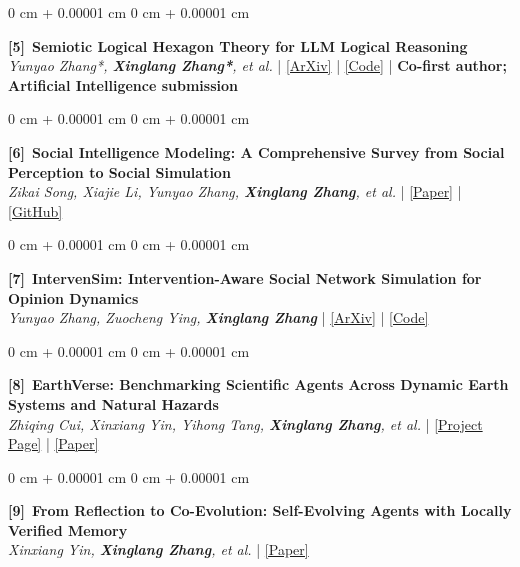 \documentclass[10pt, letterpaper]{article}
\newcommand{\pubnum}[1]{{\footnotesize\textbf{[#1]}}}
\newenvironment{onecolentry}{
    \begin{adjustwidth}{
        0 cm + 0.00001 cm
    }{
        0 cm + 0.00001 cm
    }
}{
\end{adjustwidth}
} %
\begin{document}
\begin{onecolentry}
\pubnum{5}~\textbf{Semiotic Logical Hexagon Theory for LLM Logical Reasoning} \\
\textit{Yunyao Zhang*, \textbf{Xinglang Zhang*}, et al.} |
\href{https://arxiv.org/abs/2607.21933}{\color{blue}[ArXiv]} |
\href{https://github.com/AI4SS/Logic-Agent}{\color{blue}[Code]} |
\textbf{Co-first author; Artificial Intelligence submission}
\end{onecolentry}
\vspace{0.08 cm}

\begin{onecolentry}
\pubnum{6}~\textbf{Social Intelligence Modeling: A Comprehensive Survey from Social Perception to Social Simulation} \\
\textit{Zikai Song, Xiajie Li, Yunyao Zhang, \textbf{Xinglang Zhang}, et al.} |
\href{https://www.researchgate.net/publication/411123257_Social_Intelligence_Modeling_A_Comprehensive_Survey_from_Social_Perception_to_Social_Simulation}{\color{blue}[Paper]} |
\href{https://github.com/sait-crypto/Awesome-Social-Intelligence-Modeling-System}{\color{blue}[GitHub]}
\end{onecolentry}
\vspace{0.08 cm}

\begin{onecolentry}
\pubnum{7}~\textbf{IntervenSim: Intervention-Aware Social Network Simulation for Opinion Dynamics} \\
\textit{Yunyao Zhang, Zuocheng Ying, \textbf{Xinglang Zhang}} |
\href{https://arxiv.org/abs/2604.06600}{\color{blue}[ArXiv]} |
\href{https://github.com/AI4SS/IntervenSim}{\color{blue}[Code]}
\end{onecolentry}
\vspace{0.08 cm}

\begin{onecolentry}
\pubnum{8}~\textbf{EarthVerse: Benchmarking Scientific Agents Across Dynamic Earth Systems and Natural Hazards} \\
\textit{Zhiqing Cui, Xinxiang Yin, Yihong Tang, \textbf{Xinglang Zhang}, et al.} |
\href{https://cuizhiq.github.io/EarthVerse/}{\color{blue}[Project Page]} |
\href{https://arxiv.org/abs/2608.23525}{\color{blue}[Paper]}
\end{onecolentry}
\vspace{0.05 cm}
\begin{onecolentry}
\pubnum{9}~\textbf{From Reflection to Co-Evolution: Self-Evolving Agents with Locally Verified Memory} \\
\textit{Xinxiang Yin, \textbf{Xinglang Zhang}, et al.} | \href{https://openreview.net/forum?id=PWFIHNE28h}{\color{blue}[Paper]}
\end{onecolentry}
\end{document}

